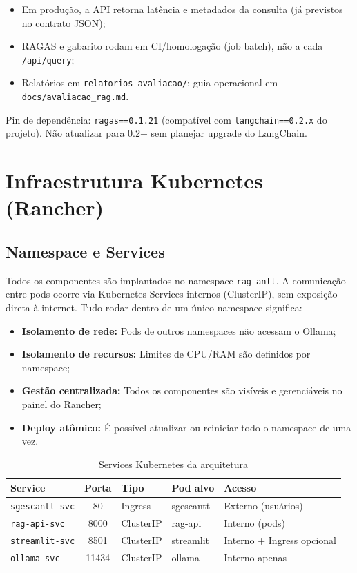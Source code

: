 \documentclass[12pt, a4paper]{article}
\begin{document}
\begin{itemize}
  \item Em produção, a API retorna latência e metadados da consulta (já previstos no contrato JSON);
  \item RAGAS e gabarito rodam em CI/homologação (job batch), não a cada \texttt{/api/query};
  \item Relatórios em \texttt{relatorios\_avaliacao/}; guia operacional em \texttt{docs/avaliacao\_rag.md}.
\end{itemize}

\noindent Pin de dependência: \texttt{ragas==0.1.21} (compatível com \texttt{langchain==0.2.x} do projeto). Não atualizar para 0.2+ sem planejar upgrade do LangChain.

\section{Infraestrutura Kubernetes (Rancher)}

\subsection{Namespace e Services}

Todos os componentes são implantados no namespace \texttt{rag-antt}. A comunicação entre pods ocorre via Kubernetes Services internos (ClusterIP), sem exposição direta à internet. Tudo rodar dentro de um único namespace significa:

\begin{itemize}
  \item \textbf{Isolamento de rede:} Pods de outros namespaces não acessam o Ollama;
  \item \textbf{Isolamento de recursos:} Limites de CPU/RAM são definidos por namespace;
  \item \textbf{Gestão centralizada:} Todos os componentes são visíveis e gerenciáveis no painel do Rancher;
  \item \textbf{Deploy atômico:} É possível atualizar ou reiniciar todo o namespace de uma vez.
\end{itemize}

\begin{table}[H]
\centering
\small
\caption{Services Kubernetes da arquitetura}
\label{tab:services}
\begin{tabularx}{\textwidth}{l c l l X}
\toprule
\textbf{Service} & \textbf{Porta} & \textbf{Tipo} & \textbf{Pod alvo} & \textbf{Acesso} \\
\midrule
\texttt{sgescantt-svc} & 80 & Ingress & sgescantt & Externo (usuários) \\
\texttt{rag-api-svc} & 8000 & ClusterIP & rag-api & Interno (pods) \\
\texttt{streamlit-svc} & 8501 & ClusterIP & streamlit & Interno + Ingress opcional \\
\texttt{ollama-svc} & 11434 & ClusterIP & ollama & Interno apenas \\
\bottomrule
\end{tabularx}
\end{table}
\end{document}
